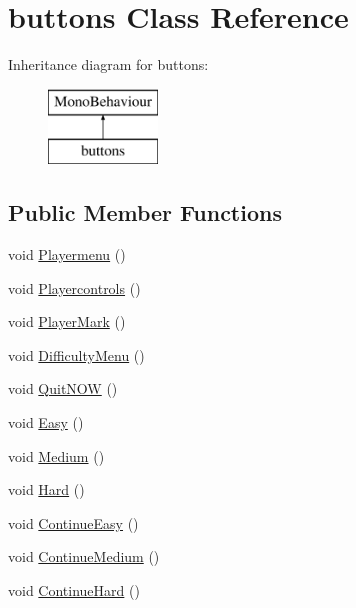 \hypertarget{classbuttons}{}\section{buttons Class Reference}
\label{classbuttons}
Inheritance diagram for buttons\+:\begin{figure}[H]
\begin{center}
\leavevmode
\includegraphics[height=2.000000cm]{classbuttons}
\end{center}
\end{figure}
\subsection*{Public Member Functions}
\begin{DoxyCompactItemize}
\item 
void \mbox{\hyperlink{classbuttons_a2a52796de295f9cc1a78a8504d4d6d17}{Playermenu}} ()
\item 
void \mbox{\hyperlink{classbuttons_abfbc76ac209b478e06ca5838794aee6b}{Playercontrols}} ()
\item 
void \mbox{\hyperlink{classbuttons_a7b6e43f9515af9731e0b3bb0024c61a1}{Player\+Mark}} ()
\item 
void \mbox{\hyperlink{classbuttons_a9b4a7efe4c0f70242e545fa98fc077be}{Difficulty\+Menu}} ()
\item 
void \mbox{\hyperlink{classbuttons_a77363e359766278453654844761de109}{Quit\+N\+OW}} ()
\item 
void \mbox{\hyperlink{classbuttons_ae997ca91888f5e46fb6f642135c5c6d2}{Easy}} ()
\item 
void \mbox{\hyperlink{classbuttons_a453a7891097123efba33130f4c3a4b34}{Medium}} ()
\item 
void \mbox{\hyperlink{classbuttons_acb209af32e987c4c20e09d8869553eda}{Hard}} ()
\item 
void \mbox{\hyperlink{classbuttons_a5240065cedeabf4dc24e9295bbcb3805}{Continue\+Easy}} ()
\item 
void \mbox{\hyperlink{classbuttons_ad0267c77caf56c63e3dbea543113c349}{Continue\+Medium}} ()
\item 
void \mbox{\hyperlink{classbuttons_a954a018dd64cf62fc51aaf7eec5f284c}{Continue\+Hard}} ()
\end{DoxyCompactItemize}


